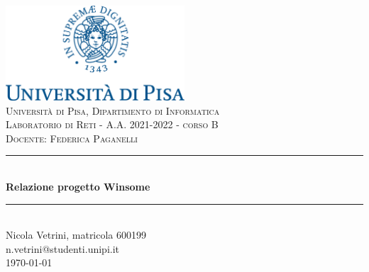 \documentclass[a4paper,11pt]{article}
\newcommand{\HRule}{\rule{\linewidth}{0.5mm}} 	%
\begin{document}
	\hypersetup{pageanchor=false}
	\begin{titlepage}
		\begin{center}
			\includegraphics[width=0.5\textwidth]{img/unipi-logo.png}\\[1cm]
			
			\textsc{\Large Università di Pisa, Dipartimento di Informatica}\\[1cm]
			
			\textsc{\Large Laboratorio di Reti - A.A. 2021-2022 - corso B}\\[0.2cm]
			\textsc{\large Docente: Federica Paganelli}\\[1cm]
			
			\HRule \\[0.8cm]
			{ \Large \bfseries Relazione progetto Winsome}\\[0.7cm]
			\HRule \\[2cm]
			
			\Large Nicola Vetrini, matricola 600199\\[0.2cm]
			n.vetrini@studenti.unipi.it\\[1cm]
			{\large \today}\\[5cm]
			
			\vfill
		\end{center}
	\end{titlepage}
	\hypersetup{pageanchor=true}
	
	\clearpage
	\tableofcontents
	\clearpage
	
\end{document}
